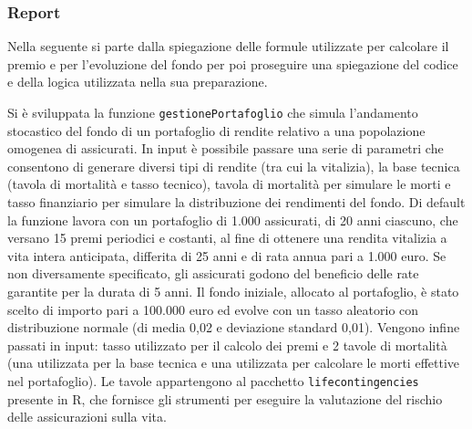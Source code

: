 \documentclass[
]{article}
\newenvironment{Shaded}{\begin{snugshade}}{\end{snugshade}}
\newcommand{\CommentTok}[1]{\textcolor[rgb]{0.56,0.35,0.01}{\textit{#1}}}
\newcommand{\FunctionTok}[1]{\textcolor[rgb]{0.00,0.00,0.00}{#1}}
\newcommand{\NormalTok}[1]{#1}
\newcommand{\OtherTok}[1]{\textcolor[rgb]{0.56,0.35,0.01}{#1}}
\newcommand{\SpecialCharTok}[1]{\textcolor[rgb]{0.00,0.00,0.00}{#1}}
\begin{document}
\begin{Shaded}
\end{Shaded}

\hypertarget{report}{%
\subsubsection{Report}\label{report}}

Nella seguente si parte dalla spiegazione delle formule utilizzate per
calcolare il premio e per l'evoluzione del fondo per poi proseguire una
spiegazione del codice e della logica utilizzata nella sua preparazione.

Si è sviluppata la funzione \texttt{gestionePortafoglio} che simula
l'andamento stocastico del fondo di un portafoglio di rendite relativo a
una popolazione omogenea di assicurati. In input è possibile passare una
serie di parametri che consentono di generare diversi tipi di rendite
(tra cui la vitalizia), la base tecnica (tavola di mortalità e tasso
tecnico), tavola di mortalità per simulare le morti e tasso finanziario
per simulare la distribuzione dei rendimenti del fondo. Di default la
funzione lavora con un portafoglio di 1.000 assicurati, di 20 anni
ciascuno, che versano 15 premi periodici e costanti, al fine di ottenere
una rendita vitalizia a vita intera anticipata, differita di 25 anni e
di rata annua pari a 1.000 euro. Se non diversamente specificato, gli
assicurati godono del beneficio delle rate garantite per la durata di 5
anni. Il fondo iniziale, allocato al portafoglio, è stato scelto di
importo pari a 100.000 euro ed evolve con un tasso aleatorio con
distribuzione normale (di media 0,02 e deviazione standard 0,01).
Vengono infine passati in input: tasso utilizzato per il calcolo dei
premi e 2 tavole di mortalità (una utilizzata per la base tecnica e una
utilizzata per calcolare le morti effettive nel portafoglio). Le tavole
appartengono al pacchetto \texttt{lifecontingencies} presente in R, che
fornisce gli strumenti per eseguire la valutazione del rischio delle
assicurazioni sulla vita.
\end{document}
